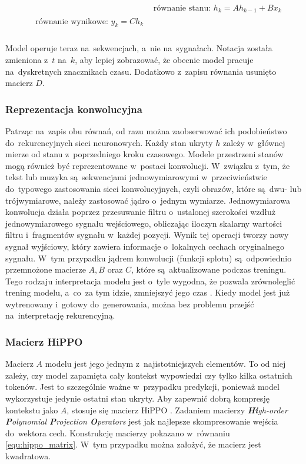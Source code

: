 \documentclass[data-science]{agh-wi} %
\begin{document}
\begin{align}
     & \text{równanie stanu: }h_k = Ah_{k-1} + Bx_k \label{equ:rownanie_stanu_seq} \\
    \begin{split}
        &\text{równanie wynikowe: }y_k = Ch_k \label{equ:rownanie_wynikowe_seq} \\
    \end{split}
\end{align}

Model operuje teraz na~sekwencjach, a~nie na~sygnałach. Notacja została zmieniona z~$t$ na~$k$, aby lepiej zobrazować, że obecnie model pracuje na~dyskretnych znacznikach czasu. Dodatkowo z~zapisu równania usunięto macierz $D$.

\subsubsection*{Reprezentacja konwolucyjna}
Patrząc na~zapis obu równań, od razu można zaobserwować ich podobieństwo do~rekurencyjnych sieci neuronowych. Każdy stan ukryty $h$ zależy w~głównej mierze od stanu z~poprzedniego kroku czasowego. Modele przestrzeni stanów mogą również być reprezentowane w~postaci konwolucji. W~związku z~tym, że tekst lub muzyka są~sekwencjami jednowymiarowymi w~przeciwieństwie do~typowego zastosowania sieci konwolucyjnych, czyli obrazów, które są~dwu- lub trójwymiarowe, należy zastosować jądro o~jednym wymiarze.  Jednowymiarowa konwolucja działa poprzez przesuwanie filtru o~ustalonej szerokości wzdłuż jednowymiarowego sygnału wejściowego, obliczając iloczyn skalarny wartości filtru i~fragmentów sygnału w~każdej pozycji. Wynik tej operacji tworzy nowy sygnał wyjściowy, który zawiera informacje o~lokalnych cechach oryginalnego sygnału. W~tym przypadku jądrem konwolucji (funkcji splotu) są~odpowiednio przemnożone macierze $A, B$ oraz $C$, które są~aktualizowane podczas treningu. Tego rodzaju interpretacja modelu jest o~tyle wygodna, że pozwala zrównoleglić trening modelu, a~co~za tym idzie, zmniejszyć jego czas \cite{ssm_notacja}. Kiedy model jest już wytrenowany i~gotowy do~generowania, można bez problemu przejść na~interpretację rekurencyjną.

\subsubsection*{Macierz HiPPO}
Macierz $A$ modelu jest jego jednym z~najistotniejszych elementów. To od niej zależy, czy model zapamięta cały kontekst wypowiedzi czy tylko kilka ostatnich tokenów. Jest to szczególnie ważne w~przypadku predykcji, ponieważ model wykorzystuje jedynie ostatni stan ukryty. Aby zapewnić dobrą kompresję kontekstu jako $A$, stosuje się macierz HiPPO \cite{hippo}. Zadaniem macierzy \textit{\textbf{Hi}gh-order \textbf{P}olynomial \textbf{P}rojection \textbf{O}perators} jest jak najlepsze skompresowanie wejścia do~wektora cech. Konstrukcję macierzy pokazano w~równaniu \ref*{equ:hippo_matrix}. W~tym przypadku można założyć, że macierz jest kwadratowa.
\end{document}

